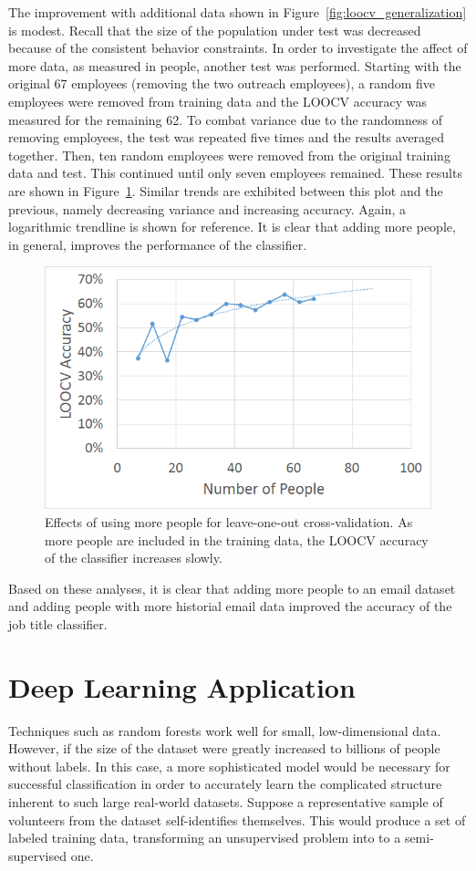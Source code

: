 \documentclass[12pt]{report}
\begin{document}
The improvement with additional data shown in Figure~\ref{fig:loocv_generalization} is modest.
Recall that the size of the population under test was decreased because of the consistent behavior constraints.
In order to investigate the affect of more data, as measured in people, another test was performed.
Starting with the original 67 employees (removing the two outreach employees), a random five employees were removed from training data and the LOOCV accuracy was measured for the remaining 62.
To combat variance due to the randomness of removing employees, the test was repeated five times and the results averaged together.
Then, ten random employees were removed from the original training data and test.
This continued until only seven employees remained.
These results are shown in Figure~\ref{fig:people_generalization}.
Similar trends are exhibited between this plot and the previous, namely decreasing variance and increasing accuracy.
Again, a logarithmic trendline is shown for reference.
It is clear that adding more people, in general, improves the performance of the classifier.
\begin{figure}[t]
    \centering
        \includegraphics[width=.7\columnwidth,trim={1mm 2mm 1mm 3.5mm},clip]{LOOCV_general}
        \vspace{-7pt}
        \caption[Effects of more people on prediction accuracy]{Effects of using more people for leave-one-out cross-validation.  As more people are included in the training data, the LOOCV accuracy of the classifier increases slowly.}
        \label{fig:people_generalization}
\end{figure}

Based on these analyses, it is clear that adding more people to an email dataset and adding people with more historial email data improved the accuracy of the job title classifier.

\section{Deep Learning Application}
Techniques such as random forests work well for small, low-dimensional data.
However, if the size of the dataset were greatly increased to billions of people without labels.
In this case, a more sophisticated model would be necessary for successful classification in order to accurately learn the complicated structure inherent to such large real-world datasets.
Suppose a representative sample of volunteers from the dataset self-identifies themselves.
This would produce a set of labeled training data, transforming an unsupervised problem into to a semi-supervised one. 
\end{document}
